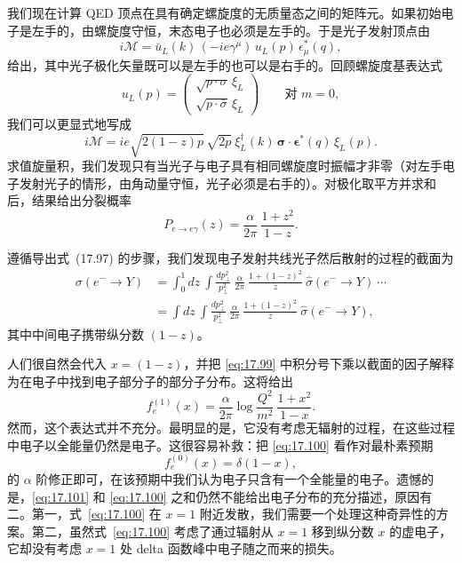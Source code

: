 我们现在计算 QED 顶点在具有确定螺旋度的无质量态之间的矩阵元。如果初始电子是左手的，由螺旋度守恒，末态电子也必须是左手的。于是光子发射顶点由
\begin{equation}
  i\mathcal{M} = \bar{u}_L(k)\,(-ie\gamma^\mu)\,u_L(p)\,
    \epsilon^{*}_\mu(q) ,
  \label{eq:17.86}
\end{equation}
给出，其中光子极化矢量既可以是左手的也可以是右手的。回顾螺旋度基表达式
\begin{equation}
  u_L(p) = \begin{pmatrix}\sqrt{p\cdot\sigma}\,\xi_L\\ \sqrt{p\cdot
    \bar{\sigma}}\,\xi_L\end{pmatrix}
  \qquad\text{对 } m = 0 ,
\end{equation}
我们可以更显式地写成
\begin{equation}
  i\mathcal{M} = ie\sqrt{2(1-z)p}\,\sqrt{2p}\ \xi^{\dagger}_L(k)\,
    \bm{\sigma}\cdot\bm{\epsilon}^{*}(q)\,\xi_L(p) .
  \label{eq:17.87}
\end{equation}
求值旋量积，我们发现只有当光子与电子具有相同螺旋度时振幅才非零（对左手电子发射光子的情形，由角动量守恒，光子必须是右手的）。对极化取平方并求和后，结果给出分裂概率
\begin{equation}
  P_{e\to e\gamma}(z) = \frac{\alpha}{2\pi}\ \frac{1+z^2}{1-z} .
\end{equation}

遵循导出式~(17.97) 的步骤，我们发现电子发射共线光子然后散射的过程的截面为
\begin{equation}
  \begin{aligned}
    \sigma(e^{-}\to Y) &= \int_0^1 dz\ \int \frac{dp_\perp^2}{p_\perp^2}\
      \frac{\alpha}{2\pi}\ \frac{1+(1-z)^2}{z}\ \hat{\sigma}(e^{-} \to Y)
      \ \cdots\\
    &= \int dz\ \int \frac{dp_\perp^2}{p_\perp^2}\ \frac{\alpha}{2\pi}\
      \frac{1+(1-z)^2}{z}\ \hat{\sigma}(e^{-} \to Y) ,
  \end{aligned}
  \label{eq:17.99}
\end{equation}
其中中间电子携带纵分数 $(1-z)$。

人们很自然会代入 $x = (1-z)$，并把 \eqref{eq:17.99} 中积分号下乘以截面的因子解释为在电子中找到电子部分子的部分子分布。这将给出
\begin{equation}
  f^{(1)}_e(x) = \frac{\alpha}{2\pi}\log\frac{Q^2}{m^2}\ \frac{1+x^2}{1-x}
  .
  \label{eq:17.100}
\end{equation}
然而，这个表达式并不充分。最明显的是，它没有考虑无辐射的过程，在这些过程中电子以全能量仍然是电子。这很容易补救：把 \eqref{eq:17.100} 看作对最朴素预期
\begin{equation}
  f^{(0)}_e(x) = \delta(1-x) ,
  \label{eq:17.101}
\end{equation}
的 $\alpha$ 阶修正即可，在该预期中我们认为电子只含有一个全能量的电子。遗憾的是，\eqref{eq:17.101} 和 \eqref{eq:17.100} 之和仍然不能给出电子分布的充分描述，原因有二。第一，式~\eqref{eq:17.100} 在 $x = 1$ 附近发散，我们需要一个处理这种奇异性的方案。第二，虽然式~\eqref{eq:17.100} 考虑了通过辐射从 $x = 1$ 移到纵分数 $x$ 的虚电子，它却没有考虑 $x = 1$ 处 delta 函数峰中电子随之而来的损失。

